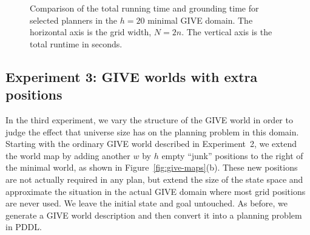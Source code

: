 \begin{figure}[t]
  \caption{Comparison of the total running time and grounding time for selected
  planners in the $h=20$ minimal GIVE domain. The horizontal axis is the grid
  width, $N = 2n$. The vertical axis is the total runtime in seconds.}
  \label{fig:give-minimal-grounding}
\end{figure}

\subsection{Experiment 3: GIVE worlds with extra positions}
\label{sec:experiment-3:-give}

In the third experiment, we vary the structure of the GIVE world in order
to judge the effect that universe size has on the planning problem in this
domain. Starting with the ordinary GIVE world described in Experiment~2, we
extend the world map by adding another $w$ by $h$ empty ``junk'' positions
to the right of the minimal world, as shown in Figure~\ref{fig:give-maps}(b).
These new positions are not actually required in any plan, but extend the
size of the state space and approximate the situation in the actual GIVE
domain where most grid positions are never used. We leave the initial state
and goal untouched. As before, we generate a GIVE world description and
then convert it into a planning problem in PDDL.


